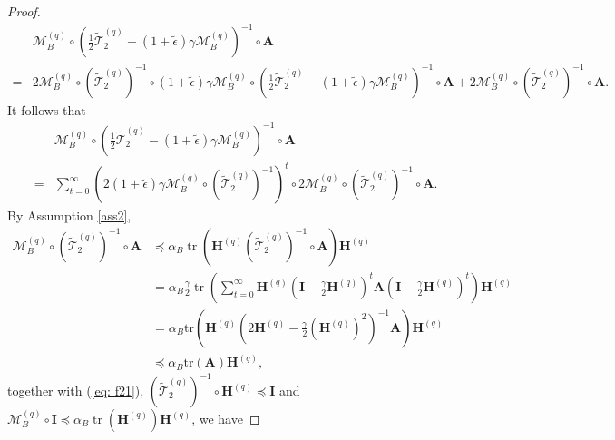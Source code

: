 \documentclass[11pt, letterpaper]{article}
\begin{document}
\begin{proof}
\begin{equation*}
\begin{aligned}
            &\mathcal{M}_B^{(q)}\circ \left(\frac{1}{2}\widetilde{\mathcal{T}}_2^{(q)}-(1+\widetilde{\epsilon})\gamma\mathcal{M}_B^{(q)}\right)^{-1}\circ\mathbf{A}\\
            =&2\mathcal{M}_B^{(q)}\circ(\widetilde{\mathcal{T}}_2^{(q)})^{-1}\circ (1+\widetilde{\epsilon})\gamma\mathcal{M}_B^{(q)}\circ \left(\frac{1}{2}\widetilde{\mathcal{T}}_2^{(q)}-(1+\widetilde{\epsilon})\gamma\mathcal{M}_B^{(q)}\right)^{-1}\circ\mathbf{A}+2\mathcal{M}_B^{(q)}\circ(\widetilde{\mathcal{T}}_2^{(q)})^{-1}\circ \mathbf{A}.
        \end{aligned}
    \end{equation*}
    It follows that
    \begin{equation}
        \label{eq: f21}
        \begin{aligned}
            &\mathcal{M}_B^{(q)}\circ \left(\frac{1}{2}\widetilde{\mathcal{T}}_2^{(q)}-(1+\widetilde{\epsilon})\gamma\mathcal{M}_B^{(q)}\right)^{-1}\circ\mathbf{A}\\
            =&\sum_{t=0}^\infty \left(2(1+\widetilde{\epsilon})\gamma\mathcal{M}_B^{(q)}\circ(\widetilde{\mathcal{T}}_2^{(q)})^{-1}\right)^t\circ 2\mathcal{M}_B^{(q)}\circ(\widetilde{\mathcal{T}}_2^{(q)})^{-1}\circ \mathbf{A}.
        \end{aligned}
    \end{equation}
    By Assumption \ref{ass2}, 
    \begin{equation*}
        \begin{aligned}
            {\mathcal{M}_B^{(q)}}\circ{(\widetilde{\mathcal{T}}_2^{(q)})}^{-1}\circ\mathbf{A}&\preceq\alpha_B\operatorname{tr}(\mathbf{H}^{(q)}{(\widetilde{\mathcal{T}}_2^{(q)})}^{-1}\circ\mathbf{A})\mathbf{H}^{(q)}\\
            &= \alpha_B \frac{\gamma}{2}\operatorname{tr}\left(\sum_{t=0}^{\infty}\mathbf{H}^{(q)}(\mathbf{I}-\frac{\gamma}{2}\mathbf{H}^{(q)})^{t}\mathbf{A}(\mathbf{I}-\frac{\gamma}{2}\mathbf{H}^{(q)})^{t}\right) \mathbf{H}^{(q)}\\
            &= \alpha_B \mathrm{tr}\left(\mathbf{H}^{(q)}(2\mathbf{H}^{(q)}-\frac{\gamma}{2}(\mathbf{H}^{(q)})^{2})^{-1}\mathbf{A}\right)\mathbf{H}^{(q)}\\
            &\preceq \alpha_B \mathrm{tr}(\mathbf{A})\mathbf{H}^{(q)},
        \end{aligned}
    \end{equation*}
    together with (\ref{eq: f21}), $(\widetilde{\mathcal{T}}_2^{(q)})^{-1}\circ\mathbf{H}^{(q)}  \preceq \mathbf{I}$ and $\mathcal{M}_B^{(q)}\circ\mathbf{I}\preceq\alpha_B\operatorname{tr}(\mathbf{H}^{(q)})\mathbf{H}^{(q)}$, we have

\end{proof}
\end{document}
